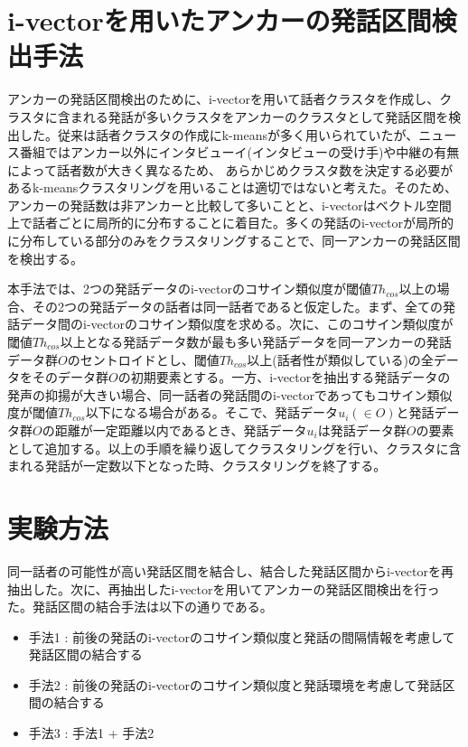 {\section{i-vectorを用いたアンカーの発話区間検出手法\cite{nozaki_gakuseikai}}
\label{section:clustering}
アンカーの発話区間検出のために、i-vectorを用いて話者クラスタを作成し、クラスタに含まれる発話が多いクラスタをアンカーのクラスタとして発話区間を検出した。従来は話者クラスタの作成にk-meansが多く用いられていたが、ニュース番組ではアンカー以外にインタビューイ(インタビューの受け手)や中継の有無によって話者数が大きく異なるため、
あらかじめクラスタ数を決定する必要があるk-meansクラスタリングを用いることは適切ではないと考えた。そのため、アンカーの発話数は非アンカーと比較して多いことと、i-vectorはベクトル空間上で話者ごとに局所的に分布することに着目た。多くの発話のi-vectorが局所的に分布している部分のみをクラスタリングすることで、同一アンカーの発話区間を検出する。\par
本手法では、2つの発話データのi-vectorのコサイン類似度が閾値$Th_{cos}$以上の場合、その2つの発話データの話者は同一話者であると仮定した。まず、全ての発話データ間のi-vectorのコサイン類似度を求める。次に、このコサイン類似度が閾値$Th_{cos}$以上となる発話データ数が最も多い発話データを同一アンカーの発話データ群$O$のセントロイドとし、閾値$Th_{cos}$以上(話者性が類似している)の全データをそのデータ群$O$の初期要素とする。一方、i-vectorを抽出する発話データの発声の抑揚が大きい場合、同一話者の発話間のi-vectorであってもコサイン類似度が閾値$Th_{cos}$以下になる場合がある。そこで、発話データ$u_i(\in O)$と発話データ群$O$の距離が一定距離以内であるとき、発話データ$u_i$は発話データ群$O$の要素として追加する。以上の手順を繰り返してクラスタリングを行い、クラスタに含まれる発話が一定数以下となった時、クラスタリングを終了する。\par

\section{実験方法}
同一話者の可能性が高い発話区間を結合し、結合した発話区間からi-vectorを再抽出した。次に、再抽出したi-vectorを用いてアンカーの発話区間検出を行った。発話区間の結合手法は以下の通りである。

\begin{itemize}
\item 手法1 : 前後の発話のi-vectorのコサイン類似度と発話の間隔情報を考慮して発話区間の結合する
\item 手法2 : 前後の発話のi-vectorのコサイン類似度と発話環境を考慮して発話区間の結合する
\item 手法3 : 手法1 + 手法2
\end{itemize}

}

